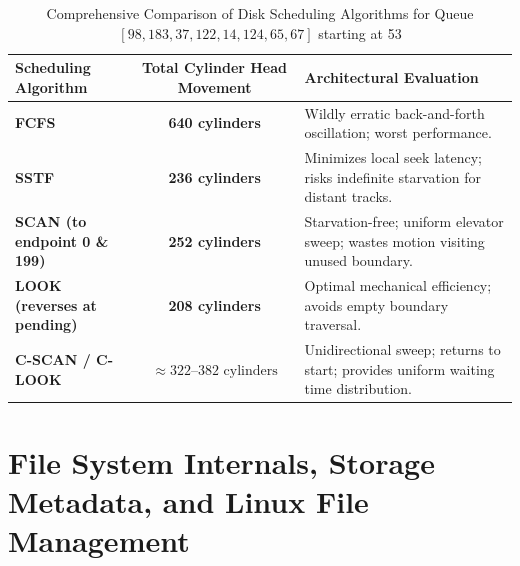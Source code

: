 \begin{table}[htbp]
\centering
\small
\caption{Comprehensive Comparison of Disk Scheduling Algorithms for Queue $[98, 183, 37, 122, 14, 124, 65, 67]$ starting at 53}
\label{tab:disk_scheduling_comparison}
\begin{tabularx}{\textwidth}{l c X}
\toprule
\textbf{Scheduling Algorithm} & \textbf{Total Cylinder Head Movement} & \textbf{Architectural Evaluation} \\
\midrule
\textbf{FCFS} & \textbf{640 cylinders} & Wildly erratic back-and-forth oscillation; worst performance. \\
\textbf{SSTF} & \textbf{236 cylinders} & Minimizes local seek latency; risks indefinite starvation for distant tracks. \\
\textbf{SCAN (to endpoint 0 \& 199)} & \textbf{252 cylinders} & Starvation-free; uniform elevator sweep; wastes motion visiting unused boundary. \\
\textbf{LOOK (reverses at pending)} & \textbf{208 cylinders} & Optimal mechanical efficiency; avoids empty boundary traversal. \\
\textbf{C-SCAN / C-LOOK} & $\approx 322\text{--}382\text{ cylinders}$ & Unidirectional sweep; returns to start; provides uniform waiting time distribution. \\
\bottomrule
\end{tabularx}
\end{table}



\section{File System Internals, Storage Metadata, and Linux File Management}
\label{sec:os_fs_internals}


